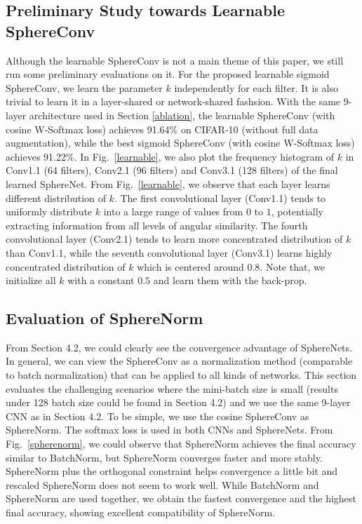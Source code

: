 \subsection{Preliminary Study towards Learnable SphereConv}

Although the learnable SphereConv is not a main theme of this paper, we still run some preliminary evaluations on it. For the proposed learnable sigmoid SphereConv, we learn the parameter $k$ independently for each filter. It is also trivial to learn it in a layer-shared or network-shared fashsion. With the same 9-layer architecture used in Section \ref{ablation}, the learnable SphereConv (with cosine W-Softmax loss) achieves 91.64\% on CIFAR-10 (without full data augmentation), while the best sigmoid SphereConv (with cosine W-Softmax loss) achieves 91.22\%. In Fig.~\ref{learnable}, we also plot the frequency histogram of $k$ in Conv1.1 (64 filters), Conv2.1 (96 filters) and Conv3.1 (128 filters) of the final learned SphereNet. From Fig.~\ref{learnable}, we observe that each layer learns different distribution of $k$. The first convolutional layer (Conv1.1) tends to uniformly distribute $k$ into a large range of values from $0$ to $1$, potentially extracting information from all levels of angular similarity. The fourth convolutional layer (Conv2.1) tends to learn more concentrated distribution of $k$ than Conv1.1, while the seventh convolutional layer (Conv3.1) learns highly concentrated distribution of $k$ which is centered around $0.8$. Note that, we initialize all $k$ with a constant $0.5$ and learn them with the back-prop.

\subsection{Evaluation of SphereNorm}

From Section 4.2, we could clearly see the convergence advantage of SphereNets. In general, we can view the SphereConv as a normalization method (comparable to batch normalization) that can be applied to all kinds of networks. This section evaluates the challenging scenarios where the mini-batch size is small (results under 128 batch size could be found in Section 4.2) and we use the same 9-layer CNN as in Section 4.2. To be simple, we use the cosine SphereConv as SphereNorm. The softmax loss is used in both CNNs and SphereNets. From Fig.~\ref{spherenorm}, we could observe that SphereNorm achieves the final accuracy similar to BatchNorm, but SphereNorm converges faster and more stably. SphereNorm plus the orthogonal constraint helps convergence a little bit and rescaled SphereNorm does not seem to work well. While BatchNorm and SphereNorm are used together, we obtain the fastest convergence and the highest final accuracy, showing excellent compatibility of SphereNorm.

